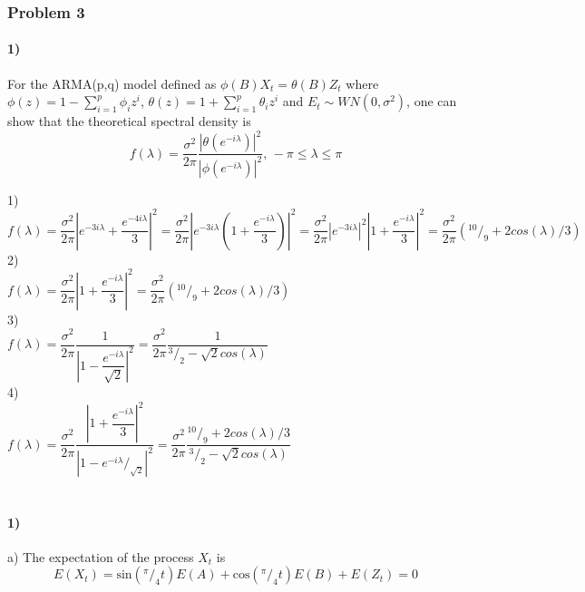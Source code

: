 \documentclass{article}
\begin{document}
\subsubsection*{Problem 3}
\paragraph{1)}
For the ARMA(p,q) model defined as $ \phi(B)X_t=\theta (B) Z_t$ where $\displaystyle \phi(z)=1-\sum_{i=1}^p \phi_i z^i$, $\displaystyle \theta(z)=1+\sum_{i=1}^p \theta_i z^i$ and $E_t \sim WN(0,\sigma^2)$, 
 one can show that the theoretical spectral density is 
 $$\displaystyle f(\lambda)
 =\dfrac{\sigma^2}{2\pi} \dfrac{\left|\theta( e^{-i\lambda})\right|^2}{\left|\phi ( e^{-i\lambda}) \right|^2}\text{, }-\pi \leq \lambda \leq \pi$$
 
 
1)\\ $\displaystyle f(\lambda)
=\dfrac{\sigma^2}{2\pi}\left| e^{-3i\lambda}+\dfrac{e^{-4i\lambda}}{3}\right|^2
=\dfrac{\sigma^2}{2\pi}\left| e^{-3i\lambda}(1+\dfrac{e^{-i\lambda}}{3})\right|^2
=\dfrac{\sigma^2}{2\pi}\left| e^{-3i\lambda}\right|^2 \left|1+\dfrac{e^{-i\lambda}}{3}\right|^2
=\dfrac{\sigma^2}{2\pi}\left(^{10}/_9+2 cos(\lambda)/3\right)$\\


2)\\ $\displaystyle f(\lambda)
=\dfrac{\sigma^2}{2\pi}\left| 1+\dfrac{e^{-i\lambda}}{3}\right|^2
=\dfrac{\sigma^2}{2\pi}\left(^{10}/_9+2 cos(\lambda)/3\right)$\\


3)\\ $\displaystyle f(\lambda)
=\dfrac{\sigma^2}{2\pi} \dfrac{1}{\left|1-\dfrac{e^{-i\lambda}}{\sqrt{2}} \right|^2}
=\dfrac{\sigma^2}{2\pi} \dfrac{1}{^3/_2-\sqrt{2} cos(\lambda)}$\\

4)\\ $\displaystyle f(\lambda)
=\dfrac{\sigma^2}{2\pi} \dfrac{\left| 1+\dfrac{e^{-i\lambda}}{3}\right|^2}{\left|1-e^{-i\lambda}/_{\sqrt{2}} \right|^2}
=\dfrac{\sigma^2}{2\pi} \dfrac{^{10}/_9+ 2 cos(\lambda)/3}{^3/_2-\sqrt{2} cos(\lambda)}$\\

\
\paragraph{1)}
a) The expectation of the process $X_t$ is
$$E(X_t)=\text{sin}(^{\pi}/_4 t) E(A) +\text{cos}(^{\pi}/_4 t) E(B)+E(Z_t)=0$$
\end{document}
